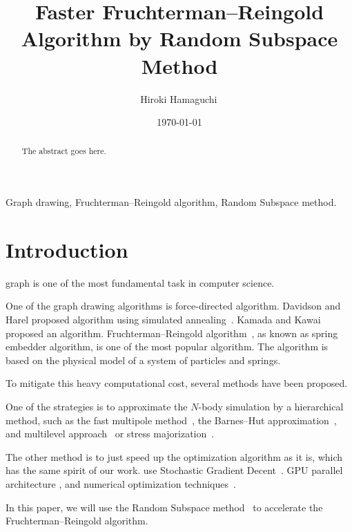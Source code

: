 \documentclass[journal]{IEEEtran}
\begin{document}
\title{Faster Fruchterman--Reingold Algorithm by Random Subspace Method}
\author{Hiroki Hamaguchi\,}
\date{\today}
\maketitle

\begin{abstract}
  The abstract goes here.
\end{abstract}

\begin{IEEEkeywords}
  Graph drawing, Fruchterman--Reingold algorithm, Random Subspace method.
\end{IEEEkeywords}

\section{Introduction}

 graph is one of the most fundamental task in computer science.

One of the graph drawing algorithms is
force-directed algorithm.
Davidson and Harel proposed algorithm using simulated annealing~\cite{davidson1996drawing}.
Kamada and Kawai~\cite{kamadaAlgorithmDrawingGeneral1989} proposed an algorithm.
Fruchterman--Reingold algorithm~\cite{fruchtermanGraphDrawingForcedirected1991}, as known as spring embedder algorithm, is one of the most popular algorithm.
The algorithm is based on the physical model of a system of particles and springs.

To mitigate this heavy computational cost, several methods have been proposed.

One of the strategies is to approximate the $N$-body simulation by a hierarchical method, such as the fast multipole method~\cite{greengardFastAlgorithmParticle1987}, the Barnes--Hut approximation~\cite{barnesHierarchicalLogForcecalculation1986}, and multilevel approach~\cite{Hu2006EfficientHF} or stress majorization~\cite{gansnerGraphDrawingStress2005}.

The other method is to just speed up the optimization algorithm as it is, which has the same spirit of our work.
use Stochastic Gradient Decent~\cite{8419285}.
GPU parallel architecture
\cite{gajdosParallelFruchtermanReingold2016},
and numerical optimization techniques~\cite{6183577}.

In this paper, we will use the Random Subspace method~\cite{NEURIPS2019_bc6dc48b,fujiRandomizedSubspaceRegularized2022,cartisRandomisedSubspaceMethods2022,higuchiFastConvergenceSecondOrder2024} to accelerate the Fruchterman--Reingold algorithm.
\end{document}

